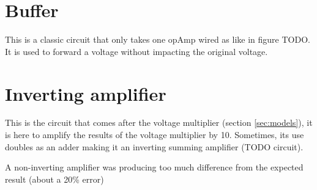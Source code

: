 \label{ap:a}

\section{Buffer}\label{apsec:buffer}

This is a classic circuit that only takes one \ac{opAmp} wired as like in figure TODO. It is used to forward a voltage without impacting the original voltage.

\section{Inverting amplifier}\label{apsec:invAmp}

This is the circuit that comes after the voltage multiplier (section \ref{sec:models}), it is here to amplify the results of the voltage multiplier by 10. Sometimes, its use doubles as an adder making it an inverting summing amplifier (TODO circuit).

A non-inverting amplifier was producing too much difference from the expected result (about a 20\% error) %
